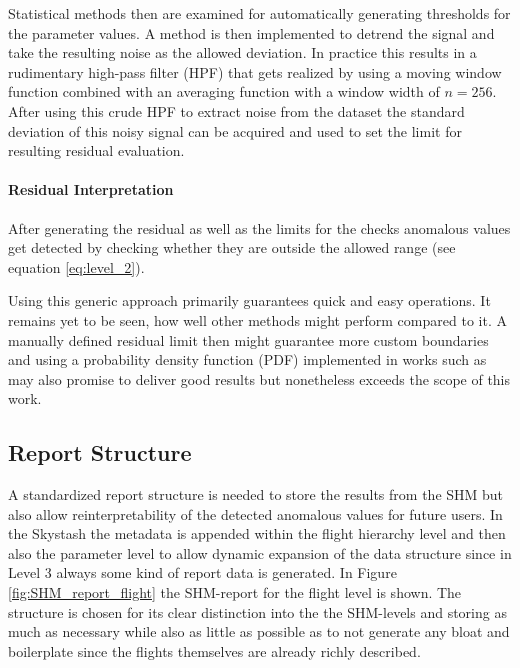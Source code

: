 Statistical methods then are examined for automatically generating thresholds for the parameter values. A method is then implemented to detrend the signal and take the resulting noise as the allowed deviation. In practice this results in a rudimentary high-pass filter (HPF) that gets realized by using a moving window function combined with an averaging function with a window width of $n=256$. After using this crude HPF to extract noise from the dataset the standard deviation of this noisy signal can be acquired and used to set the limit for resulting residual evaluation.


\paragraph{Residual Interpretation}

After generating the residual as well as the limits for the checks anomalous values get detected by checking whether they are outside the allowed range (see equation \ref{eq:level_2}).

Using this generic approach primarily guarantees quick and easy operations. It remains yet to be seen, how well other methods might perform compared to it. A manually defined residual limit then might guarantee more custom boundaries and using a probability density function (PDF) implemented in works such as \cite{svard_data-driven_2014} may also promise to deliver good results but nonetheless exceeds the scope of this work.



\subsection{Report Structure}
A standardized report structure is needed to store the results from the SHM but also allow reinterpretability of the detected anomalous values for future users. In the Skystash the metadata is appended within the flight hierarchy level and then also the parameter level to allow dynamic expansion of the data structure since in Level 3 always some kind of report data is generated. In Figure \ref{fig:SHM_report_flight} the SHM-report for the flight level is shown. The structure is chosen for its clear distinction into the the SHM-levels and storing as much as necessary while also as little as possible as to not generate any bloat and boilerplate since the flights themselves are already richly described.

